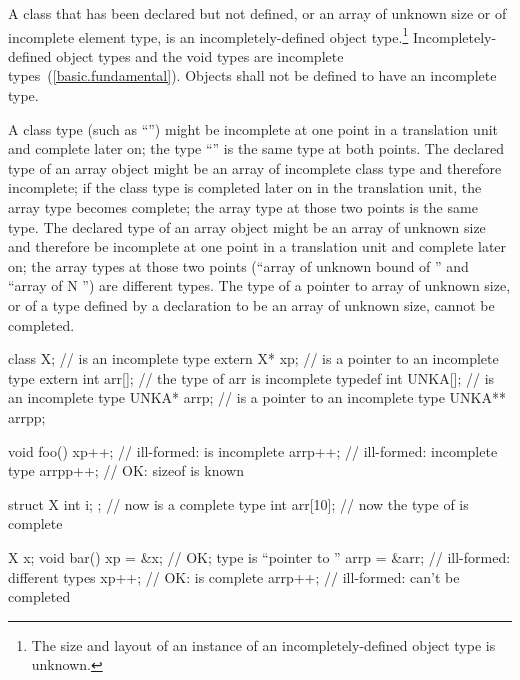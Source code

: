 \pnum
{}%
A class that has been declared but not defined, or an array of unknown
size or of incomplete element type, is an incompletely-defined object
type.\footnote{The size and layout of an instance of an incompletely-defined
object type is unknown.}
Incompletely-defined object types and the void types are incomplete
types~(\ref{basic.fundamental}). Objects shall not be defined to have an
incomplete type.

\pnum
A class type (such as ``'') might be incomplete at one
point in a translation unit and complete later on; the type
``'' is the same type at both points. The declared type
of an array object might be an array of incomplete class type and
therefore incomplete; if the class type is completed later on in the
translation unit, the array type becomes complete; the array type at
those two points is the same type. The declared type of an array object
might be an array of unknown size and therefore be incomplete at one
point in a translation unit and complete later on; the array types at
those two points (``array of unknown bound of '' and ``array of
N '') are different types. The type of a pointer to array of
unknown size, or of a type defined by a  declaration to
be an array of unknown size, cannot be completed. \enterexample

%
\begin{codeblock}
class X;                        //  is an incomplete type
extern X* xp;                   //  is a pointer to an incomplete type
extern int arr[];               // the type of arr is incomplete
typedef int UNKA[];             //  is an incomplete type
UNKA* arrp;                     //  is a pointer to an incomplete type
UNKA** arrpp;

void foo()
{
    xp++;                       // ill-formed:  is incomplete
    arrp++;                     // ill-formed: incomplete type
    arrpp++;                    // OK: sizeof  is known
}

struct X { int i; };            // now  is a complete type
int  arr[10];                   // now the type of  is complete

X x;
void bar()
{
    xp = &x;                    // OK; type is ``pointer to ''
    arrp = &arr;                // ill-formed: different types
    xp++;                       // OK:   is complete
    arrp++;                     // ill-formed:  can't be completed
}
\end{codeblock}
\exitexampleb

